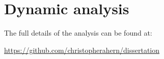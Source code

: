    
\chapter{Dynamic analysis}


The full details of the analysis can be found at:

 \url{https://github.com/christopherahern/dissertation}